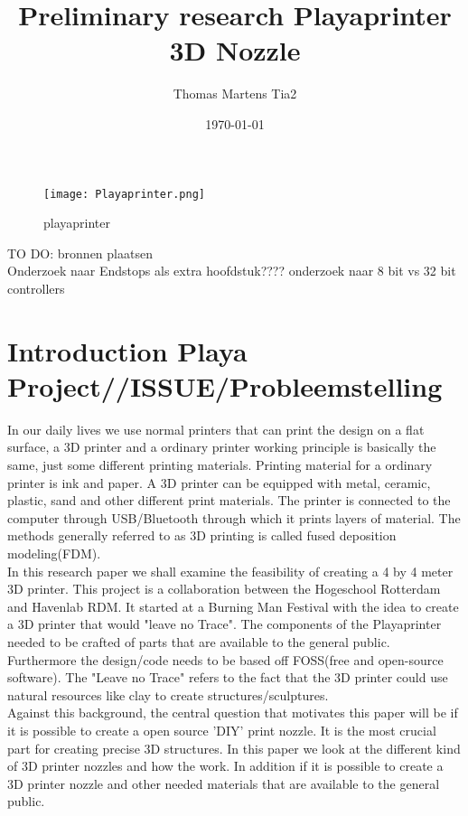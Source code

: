 \documentclass[11pt]{article}
\begin{document}
\title{Preliminary research Playaprinter 3D Nozzle}
\author{Thomas Martens Tia2}
\date{\today}
\maketitle

\begin{figure}[hbtp]
\caption{playaprinter}
\centering
\texttt{[image: Playaprinter.png]}
\end{figure}
\newpage

\tableofcontents

TO DO: bronnen plaatsen\\
		Onderzoek naar Endstops als extra hoofdstuk????
		onderzoek naar 8 bit vs 32 bit controllers
		
		
		
\newpage


\section{Introduction Playa Project//ISSUE/Probleemstelling}
In our daily lives we use normal printers that can print the design on a flat surface, a 3D printer and  a ordinary  printer  working  principle  is  basically the  same, just  some  different  printing materials. Printing material  for a ordinary  printer  is ink  and  paper. A 3D  printer can be equipped  with metal, ceramic, plastic, sand and  other  different  print  materials.  The  printer  is  connected  to  the  computer through  USB/Bluetooth through which it prints layers of material. The methods generally referred to as 3D printing is called fused deposition modeling(FDM).\\

In this research paper  we shall examine the feasibility of creating a 4 by 4 meter 3D printer. This project is a collaboration between the Hogeschool Rotterdam and Havenlab RDM. It started at a Burning Man Festival with the idea to create a 3D printer that would "leave no Trace". The components of the Playaprinter needed to be crafted of parts that are available to the general public. Furthermore the design/code needs to be based off FOSS(free and open-source software). The "Leave no Trace" refers to the fact that the 3D printer could use natural resources like clay to create structures/sculptures. \\

Against this background, the central question that motivates this paper will be if it is possible to create a open source 'DIY' print nozzle. It is the most crucial part for creating precise 3D structures. In this paper we look at the different kind of 3D printer nozzles and how the work. In addition if it is possible to create a 3D printer nozzle and other needed materials that are available to the general public.  \\
\end{document}
